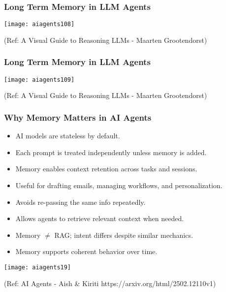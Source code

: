 \begin{frame}[fragile]\frametitle{Long Term Memory in LLM Agents}



        \begin{center}
        \texttt{[image: aiagents108]}

		
        {\tiny (Ref: A Visual Guide to Reasoning LLMs - Maarten Grootendorst)}
        \end{center}

\end{frame}

\begin{frame}[fragile]\frametitle{Long Term Memory in LLM Agents}



        \begin{center}
        \texttt{[image: aiagents109]}

		
        {\tiny (Ref: A Visual Guide to Reasoning LLMs - Maarten Grootendorst)}
        \end{center}

\end{frame}

\begin{frame}[fragile]\frametitle{Why Memory Matters in AI Agents}
\begin{itemize}
  \item AI models are stateless by default.
  \item Each prompt is treated independently unless memory is added.
  \item Memory enables context retention across tasks and sessions.
  \item Useful for drafting emails, managing workflows, and personalization.
  \item Avoids re-passing the same info repeatedly.
  \item Allows agents to retrieve relevant context when needed.
  \item Memory $\neq$ RAG; intent differs despite similar mechanics.
  \item Memory supports coherent behavior over time.
\end{itemize}

\begin{center}
\texttt{[image: aiagents19]}

{\tiny (Ref: AI Agents - Aish \& Kiriti https://arxiv.org/html/2502.12110v1)}

\end{center}	
\end{frame}

